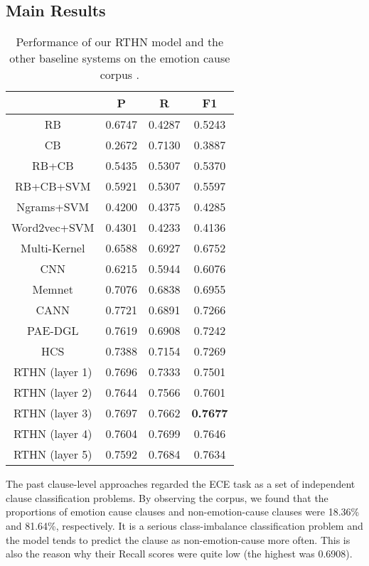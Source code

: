 \documentclass{article}
\begin{document}
\subsection{Main Results}

\begin{table}
\centering
\renewcommand\tabcolsep{4.0pt} \begin{tabular}{c|ccc}
\hline
& P & R & F1  \\
\hline
RB \cite{lee2010text} & 0.6747 & 0.4287 & 0.5243 \\
CB \cite{russo2011emocause} & 0.2672 & 0.7130 & 0.3887 \\
RB+CB & 0.5435 & 0.5307 & 0.5370 \\
RB+CB+SVM & 0.5921 & 0.5307 & 0.5597 \\
Ngrams+SVM & 0.4200 & 0.4375 & 0.4285 \\
Word2vec+SVM & 0.4301 & 0.4233 & 0.4136 \\
Multi-Kernel \cite{gui2016event} & 0.6588 & 0.6927 & 0.6752 \\
\hline
CNN \cite{kim2014convolutional} & 0.6215 & 0.5944 & 0.6076 \\
Memnet \cite{gui2017question} & 0.7076 & 0.6838 & 0.6955 \\
CANN \cite{li2018co} & 0.7721 & 0.6891 & 0.7266 \\
PAE-DGL \cite{ding2019independent} & 0.7619	 & 0.6908 & 0.7242 \\
HCS \cite{yu2019multiple} & 0.7388 & 0.7154 & 0.7269 \\
\hline
RTHN (layer 1) & 0.7696 & 0.7333 & 0.7501 \\
RTHN (layer 2) & 0.7644 & 0.7566 & 0.7601 \\
RTHN (layer 3) & 0.7697 & 0.7662 & {\bf 0.7677} \\
RTHN (layer 4) & 0.7604 & 0.7699 & 0.7646 \\
RTHN (layer 5) & 0.7592 & 0.7684 & 0.7634 \\
\hline
\end{tabular}
\caption{ Performance of our RTHN model and the other baseline systems on the emotion cause corpus \protect\cite{gui2016event}.}
\label{tab:plain}
\end{table}

The past clause-level approaches regarded the ECE task as a set of independent clause classification problems. By observing the corpus, we found that the proportions of emotion cause clauses and non-emotion-cause clauses were 18.36\% and 81.64\%, respectively. It is a serious class-imbalance classification problem and the model tends to predict the clause as non-emotion-cause more often. This is also the reason why their Recall scores were quite low (the highest was 0.6908).
\end{document}
